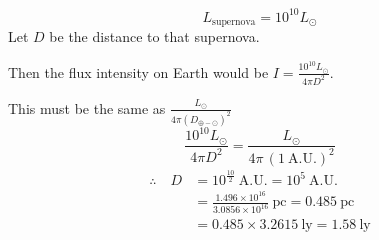 \[
L_{\text{supernova}} = 10^{10} L_{\odot}
\]
Let $D$ be the distance to that supernova.

Then the flux intensity on Earth would be
$\displaystyle I = \frac{10^{10} L_{\odot}}{4\pi D^2}$.

This must be the same as $\displaystyle \frac{L_{\odot}}{4\pi \left(D_{\oplus-\odot}\right)^2}$
\[
\frac{10^{10} L_{\odot}}{4\pi D^2} = \frac{L_{\odot}}{4\pi\,(1~\mathrm{A.U.})^2}
\]
\begin{align*}
\therefore\quad D &= 10^{\frac{10}{2}}~\mathrm{A.U.} = 10^{5}~\mathrm{A.U.}\\
&= \frac{1.496 \times 10^{16}}{3.0856 \times 10^{16}}~\mathrm{pc} = 0.485~\mathrm{pc}\\
&= 0.485 \times 3.2615~\mathrm{ly} = 1.58~\mathrm{ly}
\end{align*}

